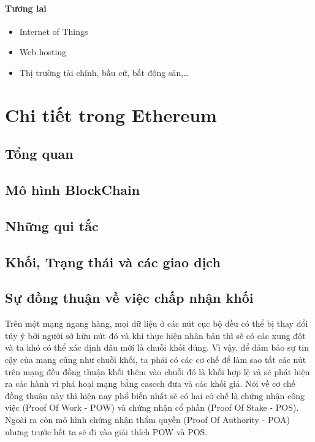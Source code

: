 \documentclass[12pt]{article}
\begin{document}
		\paragraph{Tương lai}
		\begin{itemize}
			\item Internet of Things
			
			\item Web hosting
			
			\item Thị trường tài chính, bầu cử, bất động sản,…
			
			
		\end{itemize}
	\newpage
	
	\section{Chi tiết trong Ethereum}
	
	\subsection{Tổng quan}
	
	\subsection{Mô hình BlockChain}
	
	\subsection{Những qui tắc}
	
	\subsection{Khối, Trạng thái và các giao dịch}
	
	
	\subsection{Sự đồng thuận về việc chấp nhận khối}
	Trên một mạng ngang hàng, mọi dữ liệu ở các nút cục bộ đều có thể bị thay đổi túy ý bởi người sở hữu nút đó và khi thực hiện nhân bản thì sẽ có các xung đột và ta khó có thể xác định đâu mới là chuỗi khối đúng. Vì vậy, để đảm bảo sự tin cậy của mạng cũng như chuỗi khối, ta phải có các cơ chế để làm sao tất các nút trên mạng đều đồng thuận khối thêm vào chuỗi đó là khối hợp lệ và sẽ phát hiện ra các hành vi phá hoại mạng bằng cascch đưa và các khối giả. Nói về cơ chế đồng thuận này thì hiện nay phổ biến nhất sẽ có hai cớ chế là chứng nhận công việc  (Proof Of Work - POW) và chứng nhận cổ phần (Proof Of Stake - POS). Ngoài ra còn mô hình chứng nhận thẩm quyền (Proof Of Authority - POA) nhưng trước hết ta sẽ đi vào giải thích POW và POS.
\end{document}

